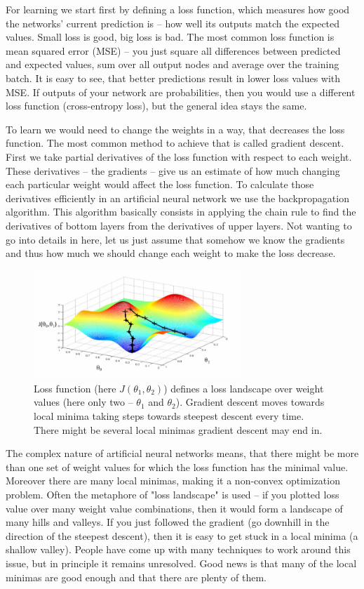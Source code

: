 \documentclass[a4paper,11pt]{article}
\begin{document}
For learning we start first by defining a loss function, which measures how good the networks' current prediction is -- how well its outputs match the expected values. Small loss is good, big loss is bad. The most common loss function is mean squared error (MSE) -- you just square all differences between predicted and expected values, sum over all output nodes and average over the training batch. It is easy to see, that better predictions result in lower loss values with MSE. If outputs of your network are probabilities, then you would use a different loss function (cross-entropy loss), but the general idea stays the same.

To learn we would need to change the weights in a way, that decreases the loss function. The most common method to achieve that is called gradient descent. First we take partial derivatives of the loss function with respect to each weight. These derivatives -- the gradients -- give us an estimate of how much changing each particular weight would affect the loss function. To calculate those derivatives efficiently in an artificial neural network we use the backpropagation algorithm. This algorithm basically consists in applying the chain rule to find the derivatives of bottom layers from the derivatives of upper layers. Not wanting to go into details in here, let us just assume that somehow we know the gradients and thus how much we should change each weight to make the loss decrease.

\begin{figure}[h]
	\centering
	\includegraphics[width=0.7\textwidth]{gradient_descent.png}
	\caption{Loss function (here $J(\theta_1,\theta_2)$) defines a loss landscape over weight values (here only two -- $\theta_1$ and $\theta_2$). Gradient descent moves towards local minima taking steps towards steepest descent every time. There might be several local minimas gradient descent may end in.}
	\label{gradient_descent}
\end{figure}

The complex nature of artificial neural networks means, that there might be more than one set of weight values for which the loss function has the minimal value. Moreover there are many local minimas, making it a non-convex optimization problem. Often the metaphore of "loss landscape" is used -- if you plotted loss value over many weight value combinations, then it would form a landscape of many hills and valleys. If you just followed the gradient (go downhill in the direction of the steepest descent), then it is easy to get stuck in a local minima (a shallow valley). People have come up with many techniques to work around this issue, but in principle it remains unresolved. Good news is that many of the local minimas are good enough and that there are plenty of them.
\end{document}
